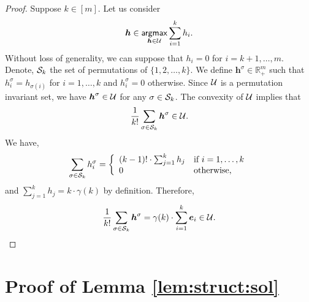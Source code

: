 \documentclass[11pt]{article}
\theoremstyle{plain}
\theoremstyle{definition}
\numberwithin{equation}{section}%
\numberwithin{equation}{section}%
\newcommand{\mb}[1]{\ensuremath{\boldsymbol{#1}}}
\begin{document}
\begin{appendix}
\begin{proof}
Suppose $ k \in [m]$. Let us consider
$$ \mb h  \in   \underset{\mb h \in {\cal U}}{  \sf argmax} \sum_{i=1}^k h_i .$$
Without loss of generality, we can suppose that $h_i =0$ for $ i =k+1,\ldots, m$. Denote, ${\cal S}_k$ the set of permutations of $\{ 1,2,\ldots,k\}$. We define $\mb h ^{\sigma} \in \mathbb{R}_+^m$ such that $h^{\sigma}_i = h_{\sigma(i) }$ for $i=1, \ldots ,k$ and $h^{\sigma}_i =0$ otherwise.
Since ${\cal U}$ is a permutation invariant set, we have $\mb h ^{\sigma} \in  {\cal U}$ for any $\sigma \in {\cal S}_k$. The convexity of ${\cal U}$ implies that
$$ \frac{1}{k!} \sum_{ \sigma \in {\cal S}_k} \mb h^{\sigma} \in {\cal U}.$$
We have,
$$  \sum_{ \sigma \in {\cal S}_k}  h^{\sigma}_i = \left\{
    \begin{array}{ll}
        (k-1)! \cdot \sum_{j=1}^k h_j & \mbox{if } i=1,\ldots,k \\
        0 & \mbox{otherwise,}
    \end{array}
\right.$$
and $\sum_{j=1}^k h_j = k \cdot \gamma(k)$ by definition. Therefore, $$ \frac{1}{k!} \sum_{ \sigma \in {\cal S}_k} \mb h^{\sigma} =
 \gamma (k) \cdot \sum_{i=1}^k \mb e_i \in {\cal U}.$$
 \end{proof}





\section{Proof of Lemma \ref{lem:struct:sol}}\label{apx-proofs:lem:struct:sol}


\end{appendix}
\end{document}
